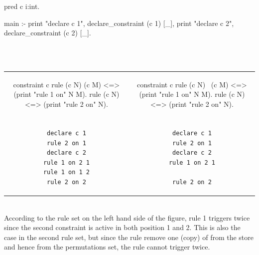 \documentclass[a4paper, 11pt]{book}
\begin{document}
\begin{center}\begin{minipage}{.6\textwidth}
\begin{elpicodelj}
pred c i:int.

main :-
  print "declare c 1",
  declare_constraint (c 1) [_],
  print "declare c 2",
  declare_constraint (c 2) [_].
\end{elpicodelj}
\end{minipage}
~\\
\vspace{1em}
~\\
\bgroup
\setlength{\tabcolsep}{1em}
\begin{tabular}{c c}
\begin{minipage}{.44\textwidth}
\begin{elpicodelj}
constraint c {
  rule (c N) (c M) <=>
    (print "rule 1 on" N M).
  rule (c N) <=>
    (print "rule 2 on" N).
}
\end{elpicodelj}
\end{minipage} &
\begin{minipage}{.44\textwidth}
\begin{elpicodelj}
constraint c {
  rule (c N) \ (c M) <=>
    (print "rule 1 on" N M).
  rule (c N) <=>
    (print "rule 2 on" N).
}
\end{elpicodelj}
\end{minipage} \\
\\
\vspace{1em}
\begin{minipage}{.44\textwidth}
\begin{verbatim}
declare c 1
rule 2 on 1
declare c 2
rule 1 on 2 1
rule 1 on 1 2
rule 2 on 2
\end{verbatim}
\end{minipage} &
\begin{minipage}{.44\textwidth}
\begin{verbatim}
declare c 1
rule 2 on 1
declare c 2
rule 1 on 2 1

rule 2 on 2
\end{verbatim}
\end{minipage}
\end{tabular}
\egroup
\end{center}
~\\

According to the rule set on the left hand side of the figure,
rule 1 triggers twice since the second  constraint
is active in both position 1 and 2. This is also the case
in the second rule set, but since the rule remove one (copy) of
 from the store and hence from the permutations set,
the rule cannot trigger twice.
\end{document}
